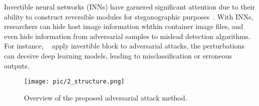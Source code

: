 Invertible neural networks (INNs) have garnered significant attention due to their ability to construct reversible modules for steganographic purposes~\cite{chen2023imperceptible}. With INNs, researchers can hide host image information whthin container image files, and even hide information from adversarial samples to mislead detection algorithms. For instance, ~\cite{lu2021large} apply invertible block to adversarial attacks, the perturbations can deceive deep learning models, leading to misclassification or erroneous outputs.



\begin{figure*}[htbp!]
\centering
\texttt{[image: pic/2\_structure.png]}
\caption{Overview of the proposed adversarial attack method.}
\label{2_structure}
\vspace{-6 mm} 
\end{figure*}